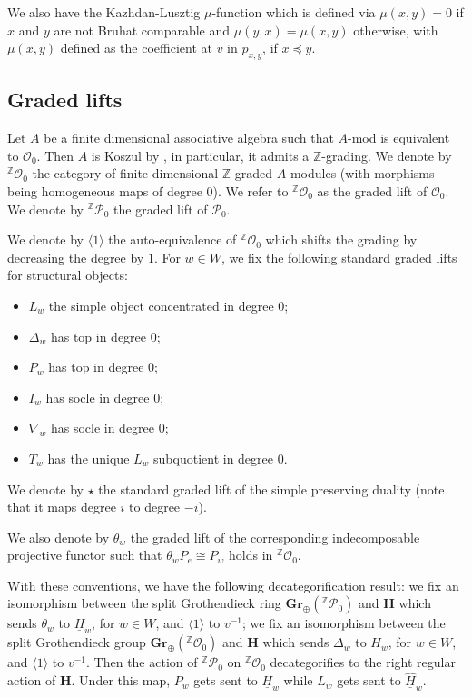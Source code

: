 \documentclass[a4paper]{amsart}
\begin{document}
We also have the Kazhdan-Lusztig $\mu$-function
which is defined  via $\mu(x,y)=0$ if
$x$ and $y$ are not Bruhat comparable and
$\mu(y,x)=\mu(x,y)$ otherwise, with 
$\mu(x,y)$ defined as  the coefficient at $v$
in $p_{x,y}$, if $x\preceq y$.

\subsection{Graded lifts}\label{s2.4}

Let $A$ be a finite dimensional associative algebra such that
$A$-mod is equivalent to $\mathcal{O}_0$. Then $A$ is Koszul
by \cite{So}, in particular, it admits a $\mathbb{Z}$-grading.
We denote by ${}^{\mathbb{Z}}\mathcal{O}_0$ the category of 
finite dimensional $\mathbb{Z}$-graded $A$-modules
(with morphisms being homogeneous maps of degree $0$).
We refer to ${}^{\mathbb{Z}}\mathcal{O}_0$ as the 
graded lift of $\mathcal{O}_0$.
We denote by ${}^{\mathbb{Z}}\mathscr{P}_0$ the 
graded lift of $\mathscr{P}_0$.

We denote by $\langle 1\rangle$ the auto-equivalence of
${}^{\mathbb{Z}}\mathcal{O}_0$ which shifts the grading 
by decreasing the degree by $1$.
For $w\in W$, we fix the following standard graded
lifts for structural objects:
\begin{itemize}
\item $L_w$ the simple object concentrated in degree $0$;
\item $\Delta_w$ has top in degree $0$;
\item $P_w$ has top in degree $0$;
\item $I_w$ has socle in degree $0$;
\item $\nabla_w$ has socle in degree $0$;
\item $T_w$ has the unique $L_w$ subquotient in degree $0$.
\end{itemize}
We denote by $\star$ the standard graded lift of the simple preserving
duality (note that it maps degree $i$ to degree $-i$).

We also denote by $\theta_w$ the graded lift of 
the corresponding indecomposable projective functor
such that $\theta_w P_e\cong P_w$ holds in 
${}^{\mathbb{Z}}\mathcal{O}_0$.

With these conventions, we have the following decategorification result:
we fix an isomorphism between the split Grothendieck ring
$\mathbf{Gr}_\oplus({}^{\mathbb{Z}}\mathscr{P}_0)$
and $\mathbf{H}$ which sends $\theta_w$ to 
$\underline{H}_w$, for $w\in W$, and $\langle 1\rangle$
to $v^{-1}$; 
we fix an isomorphism between the split Grothendieck group
$\mathbf{Gr}_\oplus({}^{\mathbb{Z}}\mathcal{O}_0)$
and $\mathbf{H}$ which sends $\Delta_w$ to 
${H}_w$, for $w\in W$, and $\langle 1\rangle$
to $v^{-1}$. Then the action of ${}^{\mathbb{Z}}\mathscr{P}_0$
on ${}^{\mathbb{Z}}\mathcal{O}_0$ decategorifies to the right regular
action of $\mathbf{H}$. Under this map, $P_w$ gets sent to
$\underline{H}_w$ while $L_w$ gets sent to
$\underline{\hat{H}}_w$.
\end{document}
